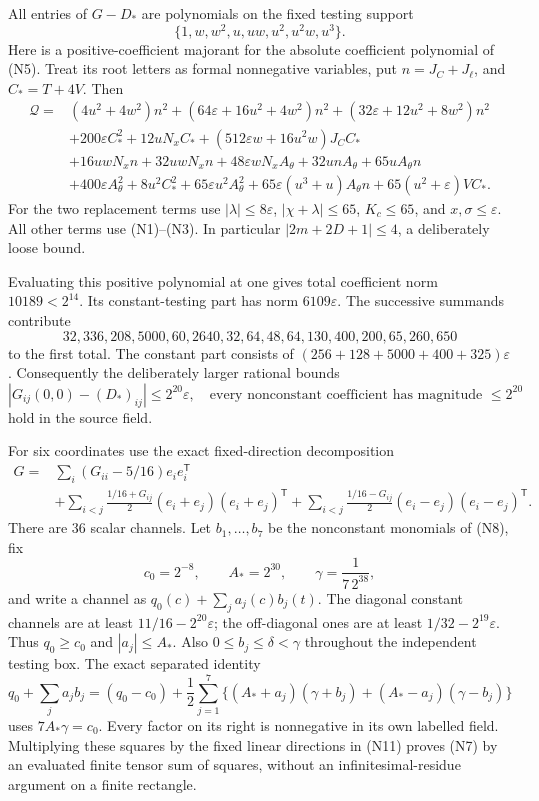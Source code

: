 \documentclass[11pt]{article}
\newcommand{\eps}{\varepsilon}
\begin{document}
All entries of $G-D_*$ are polynomials on the fixed testing support
\[
 \{1,w,w^2,u,uw,u^2,u^2w,u^3\}.                 \tag{N8}
\]
Here is a positive-coefficient majorant for the absolute coefficient
polynomial of (N5). Treat its root letters as formal nonnegative
variables, put $n=J_C+J_\ell$, and $C_*=T+4V$. Then
\[
\begin{split}
 \mathcal Q={}&(4u^2+4w^2)n^2
 +(64\eps+16u^2+4w^2)n^2
 +(32\eps+12u^2+8w^2)n^2\\
 &+200\eps C_*^2+12uN_xC_*
 +(512\eps w+16u^2w)J_CC_*\\
 &+16uwN_xn+32uwN_xn+48\eps wN_xA_\theta
 +32unA_\theta+65uA_\theta n\\
 &+400\eps A_\theta^2+8u^2C_*^2
 +65\eps u^2A_\theta^2
 +65\eps(u^3+u)A_\theta n
 +65(u^2+\eps)VC_* .
\end{split}                                                   \tag{N9}
\]
For the two replacement terms use $|\lambda|\le8\eps$,
$|\chi+\lambda|\le65$, $K_c\le65$, and $x,\sigma\le\eps$.
All other terms use (N1)--(N3). In particular
$|2m+2D+1|\le4$, a deliberately loose bound.

Evaluating this positive polynomial at one gives total coefficient
norm $10189<2^{14}$. Its constant-testing part has norm
$6109\eps$. The successive summands contribute
\[
32,336,208,5000,60,2640,32,64,48,64,130,400,200,65,260,650
\]
to the first total. The constant part consists of
$(256+128+5000+400+325)\eps$.
Consequently the deliberately larger rational bounds
\[
 |G_{ij}(0,0)-(D_*)_{ij}|\le2^{20}\eps,
 \quad\text{every nonconstant coefficient has magnitude }\le2^{20}
                                                               \tag{N10}
\]
hold in the source field.

For six coordinates use the exact fixed-direction decomposition
\[
\begin{split}
 G={}&\sum_i(G_{ii}-5/16)e_ie_i^{\mathsf T}\\
 &+\sum_{i<j}\frac{1/16+G_{ij}}2(e_i+e_j)(e_i+e_j)^{\mathsf T}
 +\sum_{i<j}\frac{1/16-G_{ij}}2(e_i-e_j)(e_i-e_j)^{\mathsf T}.
\end{split}                                                    \tag{N11}
\]
There are $36$ scalar channels. Let $b_1,\ldots,b_7$ be the
nonconstant monomials of (N8), fix
\[
 c_0=2^{-8},\qquad A_*=2^{30},\qquad
 \gamma=\frac1{7\,2^{38}},
\]
and write a channel as $q_0(c)+\sum_j a_j(c)b_j(t)$.
The diagonal constant channels are at least $11/16-2^{20}\eps$;
the off-diagonal ones are at least $1/32-2^{19}\eps$.
Thus $q_0\ge c_0$ and $|a_j|\le A_*$. Also
$0\le b_j\le\delta<\gamma$ throughout the independent testing box.
The exact separated identity
\[
 q_0+\sum_ja_jb_j=(q_0-c_0)
 +\frac12\sum_{j=1}^7
 \{(A_*+a_j)(\gamma+b_j)+(A_*-a_j)(\gamma-b_j)\}       \tag{N12}
\]
uses $7A_*\gamma=c_0$. Every factor on its right is nonnegative
in its own labelled field. Multiplying these squares by the fixed
linear directions in (N11) proves (N7) by an evaluated finite
tensor sum of squares, without an infinitesimal-residue argument
on a finite rectangle.
\end{document}
